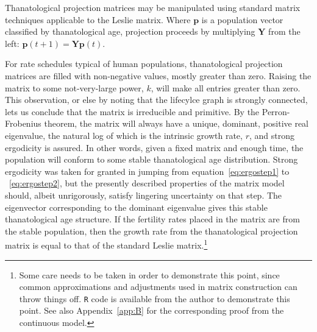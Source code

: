 \documentclass[12pt,oneside,a4paper,leqno]{article}
\begin{document}

Thanatological projection matrices may be manipulated using
standard matrix techniques applicable to the Leslie matrix. Where $\textbf{p}$
is a population vector classified by thanatological age, projection proceeds by
multiplying $\textbf{Y}$ from the left:
$\textbf{p}(t + 1) = \textbf{Y}\textbf{p}(t)$. 

For rate schedules typical of human populations, thanatological projection
matrices are filled with non-negative values, mostly greater than zero. Raising
the matrix to some not-very-large power, $k$, will make all entries greater than zero. This observation, or else by noting that the
lifecylce graph is strongly connected, lets us conclude that the matrix is
irreducible and primitive. By the Perron-Frobenius theorem, the matrix will
 always have a unique, dominant, positive real eigenvalue, the natural
log of which is the intrinsic growth rate, $r$, and strong ergodicity is
assured.
In other words, given a fixed matrix and enough time, the population will conform to some stable thanatological age distribution. Strong
ergodicity was taken for granted in jumping from equation~\eqref{eq:ergostep1}
to ~\eqref{eq:ergostep2}, but the presently described properties of the matrix
model should, albeit unrigorously, satisfy lingering uncertainty on that step.
The eigenvector corresponding to the dominant eigenvalue gives this stable
thanatological age structure. If the fertility rates placed in the matrix are
from the stable population, then the growth rate from the thanatological
projection matrix is equal to that of the standard Leslie
matrix.\footnote{Some care needs to be taken in order to demonstrate this
point, since common approximations and adjustments used in matrix
construction can throw things off. \texttt{R} code is available from the
author to demonstrate this point. See also Appendix~\ref{app:B} for the
corresponding proof from the continuous model.} 
\end{document}
